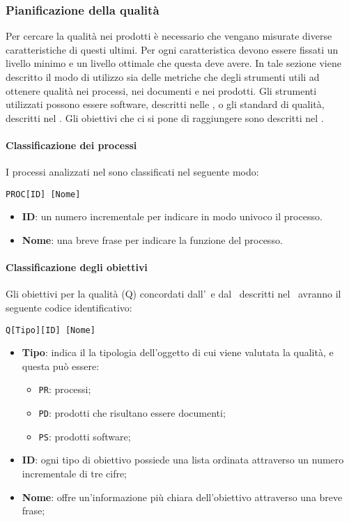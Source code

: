 		\subsubsection{Pianificazione della qualità}\label{Pianificazione qualita}
		Per cercare la qualità nei prodotti è necessario che vengano misurate diverse caratteristiche di questi ultimi.
		Per ogni caratteristica devono essere fissati un livello minimo e un livello ottimale che questa deve avere.
		In tale sezione viene descritto il modo di utilizzo sia delle metriche che degli strumenti utili ad ottenere qualità nei processi, nei documenti e nei prodotti.
		Gli strumenti utilizzati possono essere software, descritti nelle \Doc{\NdPv}, o gli standard di qualità, descritti nel \Doc{\PdQv}.
		Gli obiettivi che ci si pone di raggiungere sono descritti nel \Doc{\PdQv}.

			\paragraph{Classificazione dei processi}
			I processi analizzati nel \PdQv sono classificati nel seguente modo:

			\begin{center}
				\texttt{PROC[ID] [Nome]}
			\end{center}

			\begin{itemize}
				\item \textbf{ID}: un numero incrementale per indicare in modo univoco il processo.
				\item \textbf{Nome}: una breve frase per indicare la funzione del processo.
			\end{itemize}

			\paragraph{Classificazione degli obiettivi}
			Gli obiettivi per la qualità (Q) concordati dall'\Amm\ e dal \Ver\ descritti nel \PdQ\ avranno il seguente codice identificativo:

			\begin{center}
				\texttt{Q[Tipo][ID] [Nome]}
			\end{center}

			\begin{itemize}
				\item \textbf{Tipo}: indica il la tipologia dell'oggetto di cui viene valutata la qualità, e questa può essere:
				\begin{itemize}
					\item \texttt{PR}: processi;
					\item \texttt{PD}: prodotti che risultano essere documenti;
					\item \texttt{PS}: prodotti software;
				\end{itemize}

				\item \textbf{ID}: ogni tipo di obiettivo possiede una lista ordinata attraverso un numero incrementale di tre cifre;
				\item \textbf{Nome}: offre un'informazione più chiara dell'obiettivo attraverso una breve frase;
			\end{itemize}

